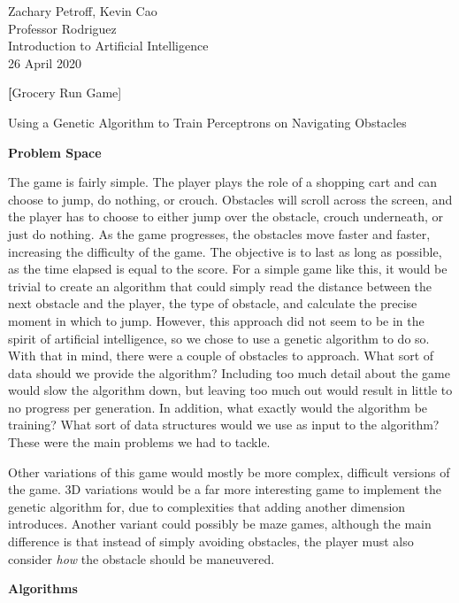 \documentclass[12pt]{article}
\begin{document}
\begin{flushleft}
Zachary Petroff, Kevin Cao \\
Professor Rodriguez \\
Introduction to Artificial Intelligence \\
26 April 2020

\begin{center}
\textbf[Grocery Run Game]

Using a Genetic Algorithm to Train Perceptrons on Navigating Obstacles
\end{center}

\setlength{\parindent}{0.5in}
\noindent\textbf{Problem Space}

The game is fairly simple. The player plays the role of a shopping cart and can choose to jump, do nothing, or crouch. Obstacles will scroll across the screen, and the player has to choose to either jump over the obstacle, crouch underneath, or just do nothing. As the game progresses, the obstacles move faster and faster, increasing the difficulty of the game. The objective is to last as long as possible, as the time elapsed is equal to the score.
For a simple game like this, it would be trivial to create an algorithm that could simply read the distance between the next obstacle and the player, the type of obstacle, and calculate the precise moment in which to jump. However, this approach did not seem to be in the spirit of artificial intelligence, so we chose to use a genetic algorithm to do so. With that in mind, there were a couple of obstacles to approach. What sort of data should we provide the algorithm? Including too much detail about the game would slow the algorithm down, but leaving too much out would result in little to no progress per generation. In addition, what exactly would the algorithm be training? What sort of data structures would we use as input to the algorithm? These were the main problems we had to tackle.

Other variations of this game would mostly be more complex, difficult versions of the game. 3D variations would be a far more interesting game to implement the genetic algorithm for, due to complexities that adding another dimension introduces. Another variant could possibly be maze games, although the main difference is that instead of simply avoiding obstacles, the player must also consider \emph{how} the obstacle should be maneuvered.

\hfill

\noindent\textbf{Algorithms}


\end{flushleft}
\end{document}
